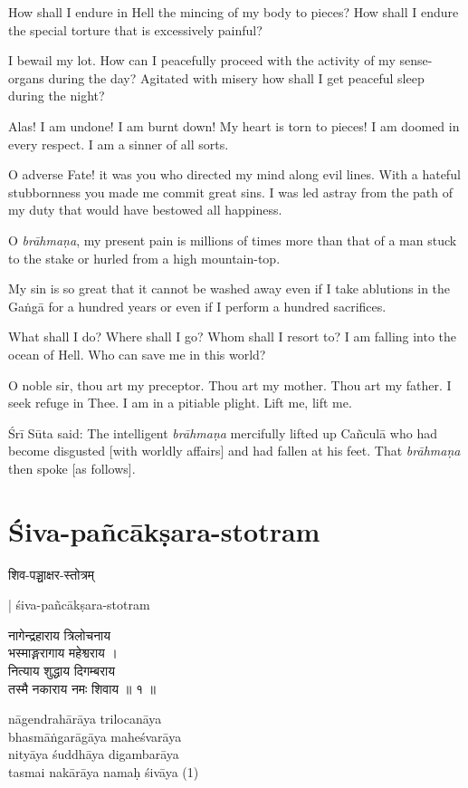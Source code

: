 \documentclass[twoside]{purana}
\begin{document}
How shall I endure in Hell the mincing of my body to pieces? How shall I endure
the special torture that is excessively painful?

I bewail my lot. How can I peacefully proceed with the activity of my
sense-organs during the day? Agitated with misery how shall I get peaceful sleep
during the night?

Alas! I am undone! I am burnt down! My heart is torn to pieces! I am doomed in
every respect. I am a sinner of all sorts.

O adverse Fate! it was you who directed my mind along evil lines. With a hateful
stubbornness you made me commit great sins. I was led astray from the path of my
duty that would have bestowed all happiness.

O \emph{brāhmaṇa}, my present pain is millions of times more than that of a man
stuck to the stake or hurled from a high mountain-top.

My sin is so great that it cannot be washed away even if I take ablutions in
the Gaṅgā for a hundred years or even if I perform a hundred sacrifices.

What shall I do? Where shall I go? Whom shall I resort to? I am falling into
the ocean of Hell. Who can save me in this world?

O noble sir, thou art my preceptor. Thou art my mother. Thou art my father.
I seek refuge in Thee. I am in a pitiable plight. Lift me, lift me.

Śrī Sūta said: The intelligent \emph{brāhmaṇa} mercifully lifted up Cañculā who
had become disgusted [with worldly affairs] and had fallen at his feet.
That \emph{brāhmaṇa} then spoke [as follows].

\chapter{Śiva-pañcākṣara-stotram}

\begin{sanskrit}शिव-पञ्चाक्षर-स्तोत्रम्\end{sanskrit} | śiva-pañcākṣara-stotram

\begin{sanskrit}
  नागेन्द्रहाराय त्रिलोचनाय\\
  भस्माङ्गरागाय महेश्वराय ।\\
  नित्याय शुद्धाय दिगम्बराय\\
  तस्मै नकाराय नमः शिवाय ॥ १ ॥
\end{sanskrit}

nāgendrahārāya trilocanāya\\
bhasmāṅgarāgāya maheśvarāya\\
nityāya śuddhāya digambarāya\\
tasmai nakārāya namaḥ śivāya (1)
\end{document}
